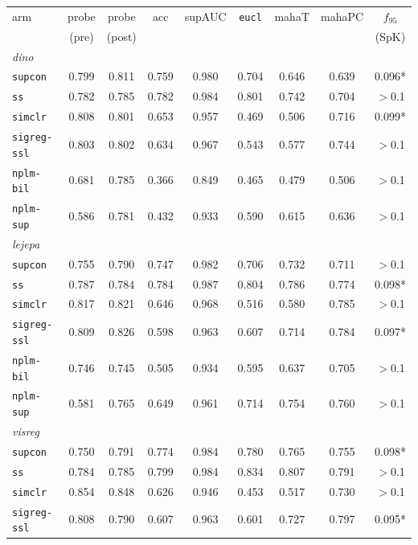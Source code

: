 \documentclass{article}
\begin{document}
\begin{table}[p]\centering\small
\setlength{\tabcolsep}{4pt}
\begin{tabular}{lcccccccc}
\toprule
arm & probe & probe & acc & supAUC & \texttt{eucl} & mahaT & mahaPC & $f_{95}$ \\
    & (pre)  & (post) &     &        &               &       &        & (SpK) \\
\midrule
\multicolumn{9}{l}{\emph{dino}}\\
\texttt{supcon} & 0.799 & 0.811 & 0.759 & 0.980 & 0.704 & 0.646 & 0.639 & 0.096* \\
\texttt{ss} & 0.782 & 0.785 & 0.782 & 0.984 & 0.801 & 0.742 & 0.704 & $>$0.1 \\
\texttt{simclr} & 0.808 & 0.801 & 0.653 & 0.957 & 0.469 & 0.506 & 0.716 & 0.099* \\
\texttt{sigreg-ssl} & 0.803 & 0.802 & 0.634 & 0.967 & 0.543 & 0.577 & 0.744 & $>$0.1 \\
\texttt{nplm-bil} & 0.681 & 0.785 & 0.366 & 0.849 & 0.465 & 0.479 & 0.506 & $>$0.1 \\
\texttt{nplm-sup} & 0.586 & 0.781 & 0.432 & 0.933 & 0.590 & 0.615 & 0.636 & $>$0.1 \\
\multicolumn{9}{l}{\emph{lejepa}}\\
\texttt{supcon} & 0.755 & 0.790 & 0.747 & 0.982 & 0.706 & 0.732 & 0.711 & $>$0.1 \\
\texttt{ss} & 0.787 & 0.784 & 0.784 & 0.987 & 0.804 & 0.786 & 0.774 & 0.098* \\
\texttt{simclr} & 0.817 & 0.821 & 0.646 & 0.968 & 0.516 & 0.580 & 0.785 & $>$0.1 \\
\texttt{sigreg-ssl} & 0.809 & 0.826 & 0.598 & 0.963 & 0.607 & 0.714 & 0.784 & 0.097* \\
\texttt{nplm-bil} & 0.746 & 0.745 & 0.505 & 0.934 & 0.595 & 0.637 & 0.705 & $>$0.1 \\
\texttt{nplm-sup} & 0.581 & 0.765 & 0.649 & 0.961 & 0.714 & 0.754 & 0.760 & $>$0.1 \\
\multicolumn{9}{l}{\emph{visreg}}\\
\texttt{supcon} & 0.750 & 0.791 & 0.774 & 0.984 & 0.780 & 0.765 & 0.755 & 0.098* \\
\texttt{ss} & 0.784 & 0.785 & 0.799 & 0.984 & 0.834 & 0.807 & 0.791 & $>$0.1 \\
\texttt{simclr} & 0.854 & 0.848 & 0.626 & 0.946 & 0.453 & 0.517 & 0.730 & $>$0.1 \\
\texttt{sigreg-ssl} & 0.808 & 0.790 & 0.607 & 0.963 & 0.601 & 0.727 & 0.797 & 0.095* \\

\end{tabular}
\end{table}
\end{document}
